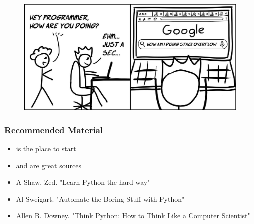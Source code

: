 \documentclass[compress, aspectratio=54]{beamer}
\begin{document}

\begin{frame}
\begin{figure}

\includegraphics[width=0.6\linewidth ]{../Figures/stack-overflow.jpeg}
\end{figure}

\end{frame}

\begin{frame}
\frametitle{Recommended Material}
\begin{itemize}
\item \href{https://www.codecademy.com/catalog/language/python}{\color{ blue}{Codecademy}} is the place to start
\item \href{https://automatetheboringstuff.com/}{\color{ blue}{Automate the Boring Stuff with Python}} and \href{https://realpython.com/}{\color{ blue}{The Real Python}} are great sources
\item A Shaw, Zed. "Learn Python the hard way"
\item Al Sweigart. "Automate the Boring Stuff with Python"
\item Allen B. Downey. "Think Python: How to Think Like a Computer Scientist"
\end{itemize}
\end{frame}
\end{document}
